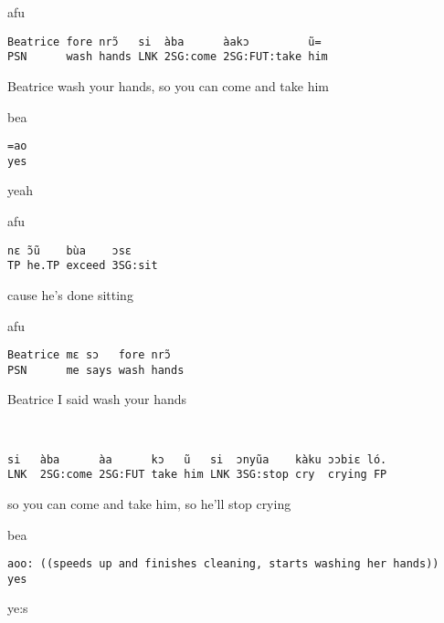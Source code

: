 \documentclass[output=paper]{langsci/langscibook}
\begin{document}
\vspace{-1mm}
%
\begin{mdframednoverticalspace}[style=firstfoc]
\begin{transbox}{1}{afu}
\begin{verbatim}
Beatrice fore nrɔ̃   si  àba      àakɔ         ũ=
PSN      wash hands LNK 2SG:come 2SG:FUT:take him
\end{verbatim}
Beatrice wash your hands, so you can come and take him
\end{transbox}
\end{mdframednoverticalspace}
%
\begin{mdframednoverticalspace}[style=secondfoc]
\begin{transbox}{2}{bea}
\begin{verbatim}
=ao
yes
\end{verbatim}
yeah
\end{transbox}
\end{mdframednoverticalspace}
%
\begin{transbox}{3}{afu}
\begin{verbatim}
nɛ ɔ̃ũ    bùa    ɔsɛ
TP he.TP exceed 3SG:sit
\end{verbatim}
cause he’s done sitting
\end{transbox}
%
%
\begin{mdframednoverticalspace}[style=firstfoc]
\begin{transbox}{5}{afu}
\begin{verbatim}
Beatrice mɛ sɔ   fore nrɔ̃
PSN      me says wash hands
\end{verbatim}
Beatrice I said wash your hands
\end{transbox}
\end{mdframednoverticalspace}
%
\begin{mdframednoverticalspace}[style=firstfoc]
\begin{transbox}{6}{~}
\begin{verbatim}
si   àba      àa      kɔ   ũ   si  ɔnyũa    kàku ɔɔbiɛ ló.
LNK  2SG:come 2SG:FUT take him LNK 3SG:stop cry  crying FP
\end{verbatim}
so you can come and take him, so he’ll stop crying
\end{transbox}
\end{mdframednoverticalspace}
%
\begin{mdframednoverticalspace}[style=secondfoc]
\begin{transbox}{7}{bea}
\begin{verbatim}
aoo: ((speeds up and finishes cleaning, starts washing her hands))
yes
\end{verbatim}
ye:s
\end{transbox}
\end{mdframednoverticalspace}
\end{document}
